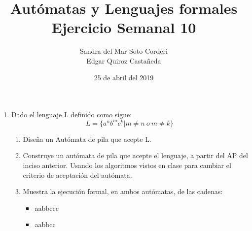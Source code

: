 \documentclass{article}
\begin{document}
    \title{
        Autómatas y Lenguajes formales \\
        Ejercicio Semanal 10
    }

    \author{
        Sandra del Mar Soto Corderi \\
        Edgar Quiroz Castañeda
    }

    \date{
        25 de abril del 2019
    }
    
    \maketitle

    \begin{enumerate}
        \item {
        Dado el lenguaje L definido como sigue:\\
        \begin{equation*}
        	L = \{a^nb^mc^k | m \neq n \ o \   m \neq k \}
        \end{equation*}
        
        
        \begin{enumerate}
        	\item {
        	Diseña un Autómata de pila que acepte L.\\
        	
            
            
        	}
        	\item{
            Construye un autómata de pila que acepte el lenguaje, a partir del
            AP del inciso anterior. Usando los algoritmos vistos en clase para
            cambiar el criterio de aceptación del autómata.\\
            
        	}
        	\item{
        	Muestra la ejecución formal, en ambos autómatas, de las cadenas:
        	
        	\begin{itemize}
        		\item {
        		aabbccc\\
        		
        		
        		}
        		\item {
        		aabbcc\\
        		
        		}
        	\end{itemize}
        		
        	}
        
        \end{enumerate}
    	}
    \end{enumerate}
\end{document}
